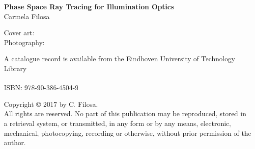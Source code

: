 
\thispagestyle{plain}

\vspace*{4cm}

\begin{center}
{\Huge \textbf{Phase Space Ray Tracing for Illumination Optics}}\\
\vspace{1cm}
{\huge{Carmela Filosa}}
\end{center}



\clearpage
\thispagestyle{plain}

\vspace*{\fill}



\noindent Cover art: \\
Photography: 

\vspace{1cm}

\noindent A catalogue record is available from the Eindhoven University of Technology Library\\
\\
\noindent ISBN:  978-90-386-4504-9\\

\vspace{1cm}

\noindent Copyright \copyright{} 2017 by C. Filosa. \\
All rights are reserved. No part of this publication may be reproduced, stored in a retrieval system, or transmitted, in any form or by any means, electronic, mechanical, photocopying, recording or otherwise, without prior permission of the author.

\clearpage


\thispagestyle{plain}

